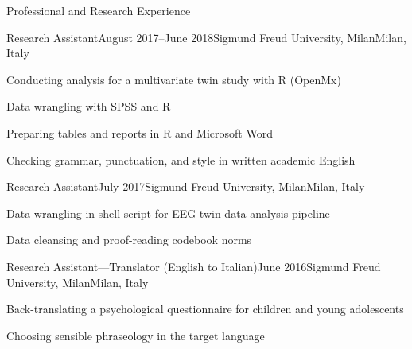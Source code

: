 \documentclass{resume2} %
\begin{document}
\begin{rSection}{Professional and Research Experience}



\begin{rSubsection}{Research Assistant}{August 2017--June 2018}{Sigmund Freud University, Milan}{Milan, Italy}
\item Conducting analysis for a multivariate twin study with R (OpenMx)
\item Data wrangling with SPSS and R%
\item Preparing tables and reports in R and Microsoft Word
\item Checking grammar, punctuation, and style in written academic English
\end{rSubsection}

\begin{rSubsection}{Research Assistant}{July 2017}{Sigmund Freud University, Milan}{Milan, Italy}
\item Data wrangling in shell script for EEG twin data analysis pipeline
\item Data cleansing and proof-reading codebook norms
\end{rSubsection}

\begin{rSubsection}{Research Assistant---Translator (English to Italian)}{June 2016}{Sigmund Freud University, Milan}{Milan, Italy}
\item Back-translating a psychological questionnaire for children and young adolescents
\item Choosing sensible phraseology in the target language
\end{rSubsection}

\end{rSection}

\end{document}
